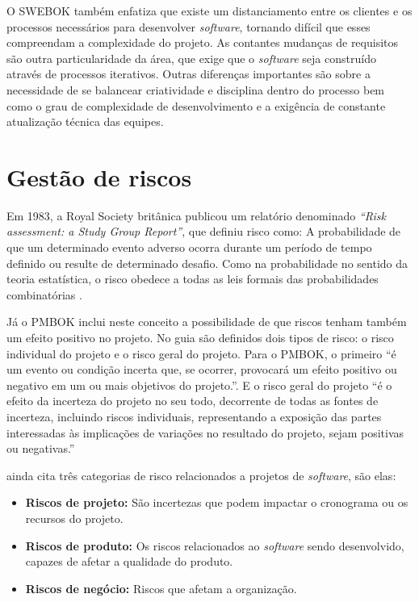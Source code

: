 \documentclass[
    12pt,       %
    openright,      %
    twoside,      %
    a4paper,      %
    english,      %
    french,       %
    spanish,      %
    brazil,       %
    ]{abntex2}
\begin{document}
O SWEBOK \cite{SWEBOK:2014} também enfatiza que existe um distanciamento entre os clientes e os processos necessários para desenvolver \textit{software}, tornando difícil que esses compreendam a complexidade do projeto. As contantes mudanças de requisitos são outra particularidade da área, que exige que o \textit{software} seja construído através de processos iterativos. Outras diferenças importantes são sobre a necessidade de se balancear criatividade e disciplina dentro do processo bem como o grau de complexidade de desenvolvimento e a exigência de constante atualização técnica das equipes.

\section{Gestão de riscos}

Em 1983, a Royal Society britânica publicou um relatório denominado \textit{``Risk assessment: a Study Group Report''}, que definiu risco como: A probabilidade de que um determinado evento adverso ocorra durante um período de tempo definido ou resulte de determinado desafio. Como na probabilidade no sentido da teoria estatística, o risco obedece a todas as leis formais das probabilidades combinatórias \cite{ADAMS:1995}. 

Já o PMBOK \cite{PMBOK:2017} inclui neste conceito a possibilidade de que riscos tenham também um efeito positivo no projeto. No guia são definidos dois tipos de risco: o risco individual do projeto e o risco geral do projeto. Para o PMBOK, o primeiro ``é um evento ou condição incerta que, se ocorrer, provocará um efeito positivo ou
negativo em um ou mais objetivos do projeto.''. E o risco geral do projeto ``é o efeito da incerteza do projeto no seu todo, decorrente de todas as fontes de incerteza, incluindo riscos individuais, representando a exposição das partes interessadas às implicações de variações no resultado do projeto, sejam positivas ou negativas.''

 ainda cita três categorias de risco relacionados a projetos de \textit{software}, são elas:

\begin{itemize}
    \item\textbf{Riscos de projeto:} São incertezas que podem impactar o cronograma ou os recursos do projeto.  
    \item\textbf{Riscos de produto:} Os riscos relacionados ao \textit{software} sendo desenvolvido, capazes de afetar a qualidade do produto.
    \item\textbf{Riscos de negócio:} Riscos que afetam a organização.
\end{itemize}
\end{document}
